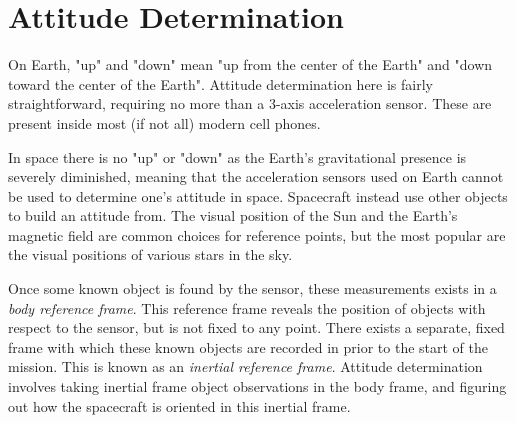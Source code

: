 \section{Attitude Determination}
On Earth, "up" and "down" mean "up from the center of the Earth" and "down toward the center of the Earth". Attitude determination here is fairly straightforward, requiring no more than a 3-axis acceleration sensor. These are present inside most (if not all) modern cell phones. 

In space there is no "up" or "down" as the Earth's gravitational presence is severely diminished, meaning that the acceleration sensors used on Earth cannot be used to determine one's attitude in space. Spacecraft instead use other objects to build an attitude from. The visual position of the Sun and the Earth's magnetic field are common choices for reference points, but the most popular are the visual positions of various stars in the sky. 

Once some known object is found by the sensor, these measurements exists in a \textit{body reference frame}. This reference frame reveals the position of objects with respect to the sensor, but is not fixed to any point. There exists a separate, fixed frame with which these known objects are recorded in prior to the start of the mission. This is known as an \textit{inertial reference frame}. Attitude determination involves taking inertial frame object observations in the body frame, and figuring out how the spacecraft is oriented in this inertial frame. 

\begin{figure}[H]
\end{figure}

